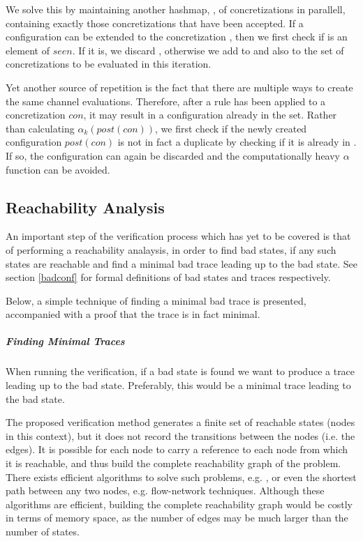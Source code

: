 We solve this by maintaining another hashmap, , of concretizations in parallell, containing exactly those concretizations that have been accepted. If a configuration  can be extended to the concretization , then we first check if  is an element of $seen$. If it is, we discard , otherwise we add  to  and also to the set of concretizations to be evaluated in this iteration.

Yet another source of repetition is the fact that there are multiple ways to create the same channel evaluations. Therefore, after a rule has been applied to a concretization $con$, it may result in a configuration already in the set. Rather than calculating $\alpha_k(post(con))$, we first check if the newly created configuration $post(con)$ is not in fact a duplicate by checking if it is already in . If so, the configuration can again be discarded and the computationally heavy $\alpha$ function can be avoided.


\subsection{Reachability Analysis}
An important step of the verification process which has yet to be covered is that of performing a reachability analaysis, in order to find bad states, if any such states are reachable and find a minimal bad trace leading up to the bad state. See section \ref{badconf} for formal definitions of bad states and traces respectively.

Below, a simple technique of finding a minimal bad trace is presented, accompanied with a proof that the trace is in fact minimal.

\subparagraph{Finding Minimal Traces}
When running the verification, if a bad state is found we want to produce a trace leading up to the bad state. Preferably, this would be a minimal trace leading to the bad state.

The proposed verification method generates a finite set of reachable states (nodes in this context), but it does not record the transitions between the nodes (i.e. the edges). It is possible for each node  to carry a reference to each node  from which it is reachable, and thus build the complete reachability graph of the problem. There exists efficient algorithms to solve such problems, e.g. , or even the shortest path between any two nodes, e.g. flow-network techniques. Although these algorithms are efficient, building the complete reachability graph would be costly in terms of memory space, as the number of edges may be much larger than the number of states.

